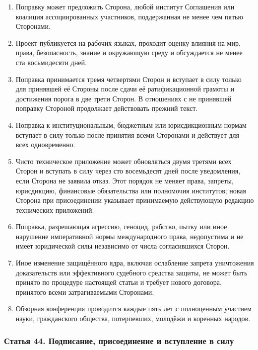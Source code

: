 \documentclass[
  russian,
  11pt,
  a4paper,
]{article}
\providecommand{\tightlist}{%
  \setlength{\itemsep}{0pt}\setlength{\parskip}{0pt}}
\begin{document}
\begin{enumerate}
\def\labelenumi{\arabic{enumi}.}
\tightlist
\item
  Поправку может предложить Сторона, любой институт Соглашения или
  коалиция ассоциированных участников, поддержанная не менее чем пятью
  Сторонами.
\item
  Проект публикуется на рабочих языках, проходит оценку влияния на мир,
  права, безопасность, знание и окружающую среду и обсуждается не менее
  ста восьмидесяти дней.
\item
  Поправка принимается тремя четвертями Сторон и вступает в силу только
  для принявшей её Стороны после сдачи её ратификационной грамоты и
  достижения порога в две трети Сторон. В отношениях с не принявшей
  поправку Стороной продолжает действовать прежний текст.
\item
  Поправка к институциональным, бюджетным или юрисдикционным нормам
  вступает в силу только после принятия всеми Сторонами и действует для
  всех одновременно.
\item
  Чисто техническое приложение может обновляться двумя третями всех
  Сторон и вступать в силу через сто восемьдесят дней после уведомления,
  если Сторона не заявила отказ. Этот порядок не меняет права, запреты,
  юрисдикцию, финансовые обязательства или полномочия институтов; новая
  Сторона при присоединении указывает принимаемую действующую редакцию
  технических приложений.
\item
  Поправка, разрешающая агрессию, геноцид, рабство, пытку или иное
  нарушение императивной нормы международного права, недопустима и не
  имеет юридической силы независимо от числа согласившихся Сторон.
\item
  Иное изменение защищённого ядра, включая ослабление запрета
  уничтожения доказательств или эффективного судебного средства защиты,
  не может быть принято по процедуре настоящей статьи и требует нового
  договора, принятого всеми затрагиваемыми Сторонами.
\item
  Обзорная конференция проводится каждые пять лет с полноценным участием
  науки, гражданского общества, потерпевших, молодёжи и коренных
  народов.
\end{enumerate}

\subsubsection{Статья 44. Подписание, присоединение и вступление в
силу}\label{ux441ux442ux430ux442ux44cux44f-44-ux43fux43eux434ux43fux438ux441ux430ux43dux438ux435-ux43fux440ux438ux441ux43eux435ux434ux438ux43dux435ux43dux438ux435-ux438-ux432ux441ux442ux443ux43fux43bux435ux43dux438ux435-ux432-ux441ux438ux43bux443}
\end{document}
